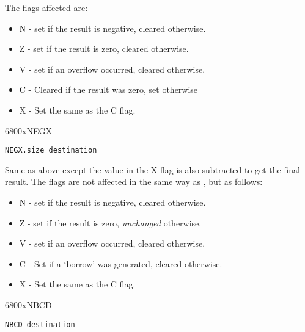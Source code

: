 The flags affected are:
\begin{itemize}[itemsep=0pt]

\item{}N -{} set if the result is negative, cleared otherwise.


\item{}Z -{} set if the result is zero, cleared otherwise.


\item{}V -{} set if an overflow occurred, cleared otherwise.


\item{}C -{} Cleared if the result was zero, set otherwise


\item{}X -{} Set the same as the C flag.

\end{itemize}
\mc6800x{NEGX}
\begin{lstlisting}[firstnumber=1,]
          NEGX.size destination
\end{lstlisting}

Same as  above except the value in the X flag is also
      subtracted to get the final result. The flags are not affected in the
      same way as , but as follows:
\begin{itemize}[itemsep=0pt]

\item{}N -{} set if the result is negative, cleared otherwise.


\item{}Z -{} set if the result is zero, \emph{unchanged} otherwise.


\item{}V -{} set if an overflow occurred, cleared otherwise.


\item{}C -{} Set if a `borrow' was generated, cleared otherwise.


\item{}X -{} Set the same as the C flag.

\end{itemize}

\mc6800x{NBCD}
\begin{lstlisting}[firstnumber=1,]
          NBCD destination
\end{lstlisting}

